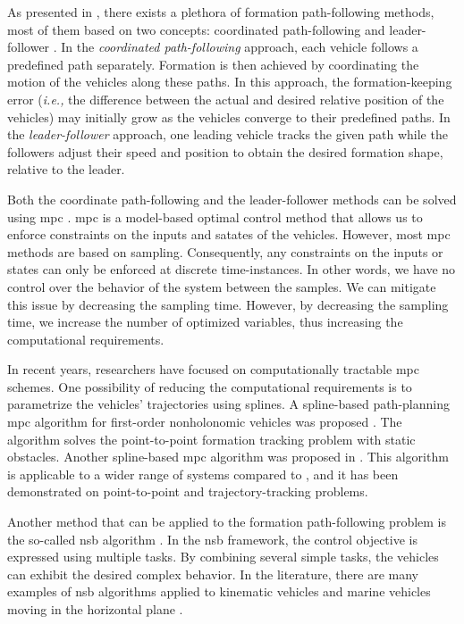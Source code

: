 As presented in \cite{das_cooperative_2016}, there exists a plethora of formation path-following methods, most of them based on two concepts: coordinated path-following \cite{borhaug_2006_formation,praveen_cooperative_2018} and leader-follower \cite{rongxin_2010_leader,soorki_2011_robust}.
In the \emph{coordinated path-following} approach, each vehicle follows a predefined path separately.
Formation is then achieved by coordinating the motion of the vehicles along these paths.
In this approach, the formation-keeping error (\emph{i.e.,} the difference between the actual and desired relative position of the vehicles) may initially grow as the vehicles converge to their predefined paths.
In the \emph{leader-follower} approach, one leading vehicle tracks the given path while the followers adjust their speed and position to obtain the desired formation shape, relative to the leader.

Both the coordinate path-following and the leader-follower methods can be solved using \acrlong{mpc} \cite{wang_path_2021,kanjanawanishkul_distributed_2008}.
\Gls{mpc} is a model-based optimal control method that allows us to enforce constraints on the inputs and satates of the vehicles.
However, most \gls{mpc} methods are based on sampling.
Consequently, any constraints on the inputs or states can only be enforced at discrete time-instances.
In other words, we have no control over the behavior of the system between the samples.
We can mitigate this issue by decreasing the sampling time.
However, by decreasing the sampling time, we increase the number of optimized variables, thus increasing the computational requirements.

In recent years, researchers have focused on computationally tractable \gls{mpc} schemes.
One possibility of reducing the computational requirements is to parametrize the vehicles' trajectories using splines.
A spline-based path-planning \gls{mpc} algorithm for first-order nonholonomic vehicles was proposed \cite{saska_2016_predictive}.
The algorithm solves the point-to-point formation tracking problem with static obstacles.
Another spline-based \gls{mpc} algorithm was proposed in \cite{van_parys_2017_DMPC}.
This algorithm is applicable to a wider range of systems compared to \cite{saska_2016_predictive}, and it has been demonstrated on point-to-point and trajectory-tracking problems.

Another method that can be applied to the formation path-following problem is the so-called \gls{nsb} algorithm \cite{antonelli_experiments_2009,arrichiello_formation_2006,pang_2019_formation,eek_formation_2021}.
In the \gls{nsb} framework, the control objective is expressed using multiple tasks.
By combining several simple tasks, the vehicles can exhibit the desired complex behavior.
In the literature, there are many examples of \gls{nsb} algorithms applied to kinematic vehicles \cite{antonelli_experiments_2009} and marine vehicles moving in the 
horizontal plane \cite{arrichiello_formation_2006,pang_2019_formation,eek_formation_2021}.

